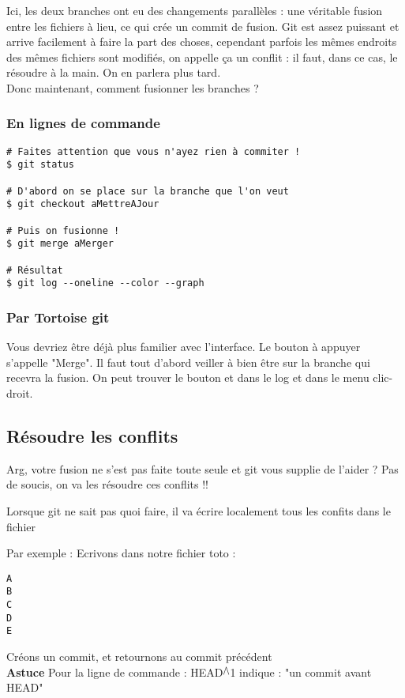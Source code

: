 Ici, les deux branches ont eu des changements parallèles : une véritable fusion entre les fichiers à lieu, ce qui crée un commit de fusion.
Git est assez puissant et arrive facilement à faire la part des choses, cependant parfois les mêmes endroits des mêmes fichiers sont modifiés, on appelle ça un conflit : il faut, dans ce cas, le résoudre à la main. On en parlera plus tard. \\

Donc maintenant, comment fusionner les branches ?
\subsubsection{En lignes de commande}
\begin{verbatim}
# Faites attention que vous n'ayez rien à commiter !
$ git status

# D'abord on se place sur la branche que l'on veut
$ git checkout aMettreAJour

# Puis on fusionne !
$ git merge aMerger

# Résultat
$ git log --oneline --color --graph
\end{verbatim}

\subsubsection{Par Tortoise git}
Vous devriez être déjà plus familier avec l'interface.
Le bouton à appuyer s'appelle "Merge".
Il faut tout d'abord veiller à bien être sur la branche qui recevra la fusion.
On peut trouver le bouton et dans le log et dans le menu clic-droit.
\newpage
\subsection{Résoudre les conflits}

Arg, votre fusion ne s'est pas faite toute seule et git vous supplie de l'aider ?
Pas de soucis, on va les résoudre ces conflits !!

Lorsque git ne sait pas quoi faire, il va écrire localement tous les confits dans le fichier

Par exemple :
Ecrivons dans notre fichier toto :
\begin{verbatim}
A
B
C
D
E
\end{verbatim}

Créons un commit, et retournons au commit précédent\\

\textbf{Astuce} Pour la ligne de commande : HEAD$^{\bigwedge}$1 indique : "un commit avant HEAD"\\

